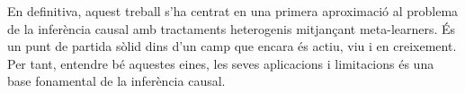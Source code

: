 \documentclass[../main.tex]{subfiles}
\begin{document}
En definitiva, aquest treball s’ha centrat en una primera aproximació al problema de la inferència causal amb tractaments heterogenis mitjançant meta-learners. És un punt de partida sòlid dins d’un camp que encara és actiu, viu i en creixement. Per tant, entendre bé aquestes eines, les seves aplicacions i limitacions és una base fonamental de la inferència causal.

    
\end{document}
